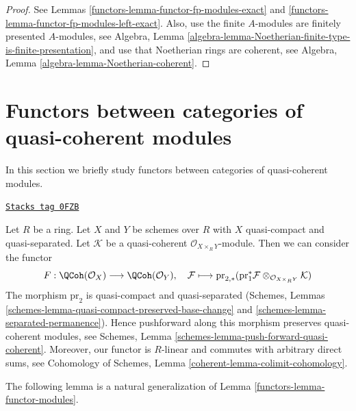 \begin{proof}

See Lemmas \ref{functors-lemma-functor-fp-modules-exact} and
\ref{functors-lemma-functor-fp-modules-left-exact}.
Also, use the finite $A$-modules are finitely presented $A$-modules,
see Algebra, Lemma
\ref{algebra-lemma-Noetherian-finite-type-is-finite-presentation},
and use that Noetherian rings are coherent, see
Algebra, Lemma \ref{algebra-lemma-Noetherian-coherent}.
\end{proof}

\section{Functors between categories of quasi-coherent modules}
\label{functors-section-functor-quasi-coherent}
In this section we briefly study functors between categories of
quasi-coherent modules.

\begin{example}
\label{functors-example-functor-quasi-coherent}
\href{https://stacks.math.columbia.edu/tag/0FZB}{\texttt{Stacks tag 0FZB}}

Let $R$ be a ring. Let $X$ and $Y$ be
schemes over $R$ with $X$ quasi-compact and quasi-separated.
Let $\mathcal{K}$ be a quasi-coherent $\mathcal{O}_{X \times_R Y}$-module.
Then we can consider the functor
\begin{equation}
\label{equation-FM-QCoh}
F : \QCoh(\mathcal{O}_X) \longrightarrow \QCoh(\mathcal{O}_Y),\quad
\mathcal{F} \longmapsto
\text{pr}_{2, *}(\text{pr}_1^*\mathcal{F}
\otimes_{\mathcal{O}_{X \times_R Y}} \mathcal{K})
\end{equation}
The morphism $\text{pr}_2$ is quasi-compact and quasi-separated
(Schemes, Lemmas \ref{schemes-lemma-quasi-compact-preserved-base-change}
and \ref{schemes-lemma-separated-permanence}). Hence pushforward along
this morphism preserves quasi-coherent modules, see
Schemes, Lemma \ref{schemes-lemma-push-forward-quasi-coherent}.
Moreover, our functor is $R$-linear and commutes with arbitrary direct sums,
see Cohomology of Schemes, Lemma \ref{coherent-lemma-colimit-cohomology}.
\end{example}

The following lemma is a natural generalization of
Lemma \ref{functors-lemma-functor-modules}.

